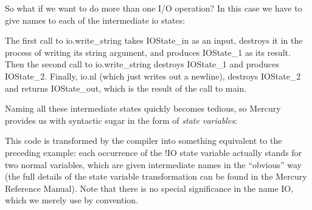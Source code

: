 \documentclass[a4paper,11pt,notitlepage,onecolumn]{book}
\begin{document}
So what if we want to do more than one I/O operation?  In this case we have
to give names to each of the intermediate \textsf{io} states:
\begin{small}

\begin{ptabular}
\nextline
{}
\nextline
{}
\nextline
{}
\nextline
\end{ptabular}

\end{small}
The first call to \textsf{io.write\_string} takes \textsf{IOState\_in} as an input, destroys it
in the process of writing its string argument, and produces \textsf{IOState\_1} as its
result.  Then the second call to \textsf{io.write\_string} destroys \textsf{IOState\_1}
and produces \textsf{IOState\_2}.  Finally, \textsf{io.nl} (which just writes out a
newline), destroys \textsf{IOState\_2} and returns \textsf{IOState\_out}, which is the
result of the call to \textsf{main}.

Naming all these intermediate states quickly becomes tedious, so Mercury
provides us with syntactic sugar in the form of \emph{state variables}:
\begin{small}

\begin{ptabular}
\nextline
{}
\nextline
{}
\nextline
{}
\nextline
\end{ptabular}

\end{small}
This code is transformed by the compiler into something equivalent to the
preceding example: each occurrence of the \textsf{!IO} state variable actually
stands for two normal variables, which are given intermediate names in the
``obvious'' way (the full details of the state variable transformation can
be found in the Mercury Reference Manual).  Note that there is no special
significance in the name \textsf{IO}, which we merely use by convention.
\end{document}
